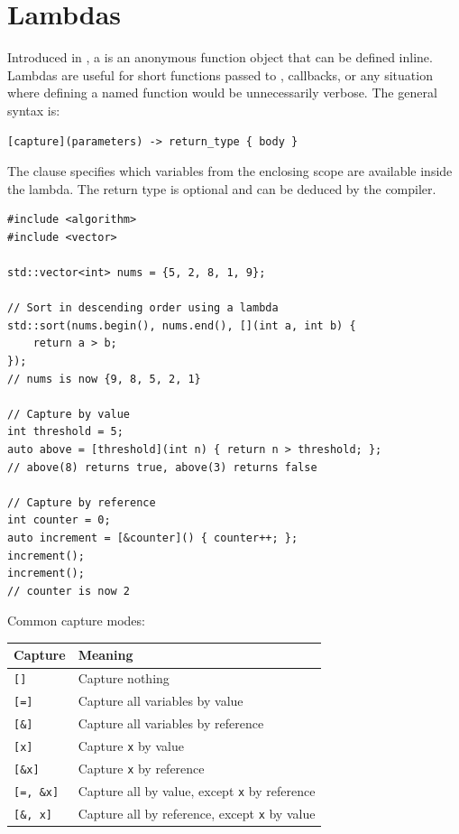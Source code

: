 \section{Lambdas}
Introduced in , a  is an anonymous function object that can be defined inline. Lambdas are useful for short functions passed to , callbacks, or any situation where defining a named function would be unnecessarily verbose. The general syntax is:
\begin{lstlisting}
[capture](parameters) -> return_type { body }
\end{lstlisting}
The  clause specifies which variables from the enclosing scope are available inside the lambda. The return type is optional and can be deduced by the compiler.
\begin{lstlisting}
#include <algorithm>
#include <vector>

std::vector<int> nums = {5, 2, 8, 1, 9};

// Sort in descending order using a lambda
std::sort(nums.begin(), nums.end(), [](int a, int b) {
    return a > b;
});
// nums is now {9, 8, 5, 2, 1}

// Capture by value
int threshold = 5;
auto above = [threshold](int n) { return n > threshold; };
// above(8) returns true, above(3) returns false

// Capture by reference
int counter = 0;
auto increment = [&counter]() { counter++; };
increment();
increment();
// counter is now 2
\end{lstlisting}
Common capture modes:
\begin{center}
\begin{tabular}{l|l}
Capture & Meaning \\
\hline
\texttt{[]} & Capture nothing \\
\texttt{[=]} & Capture all variables by value \\
\texttt{[\&]} & Capture all variables by reference \\
\texttt{[x]} & Capture \texttt{x} by value \\
\texttt{[\&x]} & Capture \texttt{x} by reference \\
\texttt{[=, \&x]} & Capture all by value, except \texttt{x} by reference \\
\texttt{[\&, x]} & Capture all by reference, except \texttt{x} by value \\
\end{tabular}
\end{center}

